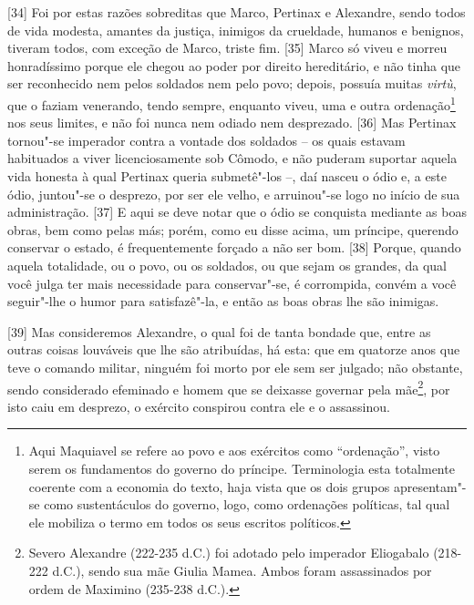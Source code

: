 {[}34{]} Foi por estas razões sobreditas que Marco, Pertinax e
Alexandre, sendo todos de vida modesta, amantes da justiça, inimigos da
crueldade, humanos e benignos, tiveram todos, com exceção de Marco,
triste fim. {[}35{]} Marco só viveu e morreu honradíssimo porque ele
chegou ao poder por direito hereditário, e não tinha que ser reconhecido
nem pelos soldados nem pelo povo; depois, possuía muitas \emph{virtù},
que o faziam venerando, tendo sempre, enquanto viveu, uma e outra
ordenação\footnote{Aqui Maquiavel se refere ao povo e aos exércitos como
  ``ordenação'', visto serem os fundamentos do governo do príncipe.
  Terminologia esta totalmente coerente com a economia do texto, haja
  vista que os dois grupos apresentam"-se como sustentáculos do governo,
  logo, como ordenações políticas, tal qual ele mobiliza o termo em
  todos os seus escritos políticos.} nos seus limites, e não foi nunca
nem odiado nem desprezado. {[}36{]} Mas Pertinax tornou"-se imperador
contra a vontade dos soldados -- os quais estavam habituados a viver
licenciosamente sob Cômodo, e não puderam suportar aquela vida honesta à
qual Pertinax queria submetê"-los --, daí nasceu o ódio e, a este ódio,
juntou"-se o desprezo, por ser ele velho, e arruinou"-se logo no início de
sua administração. {[}37{]} E aqui se deve notar que o ódio se conquista
mediante as boas obras, bem como pelas más; porém, como eu disse acima,
um príncipe, querendo conservar o estado, é frequentemente forçado a não
ser bom. {[}38{]} Porque, quando aquela totalidade, ou o povo, ou os
soldados, ou que sejam os grandes, da qual você julga ter mais
necessidade para conservar"-se, é corrompida, convém a você seguir"-lhe o
humor para satisfazê"-la, e então as boas obras lhe são inimigas.

{[}39{]} Mas consideremos Alexandre, o qual foi de tanta bondade que,
entre as outras coisas louváveis que lhe são atribuídas, há esta: que em
quatorze anos que teve o comando militar, ninguém foi morto por ele sem
ser julgado; não obstante, sendo considerado efeminado e homem que se
deixasse governar pela mãe\footnote{Severo Alexandre (222-235 d.C.) foi
  adotado pelo imperador Eliogabalo (218-222 d.C.), sendo sua mãe Giulia
  Mamea. Ambos foram assassinados por ordem de Maximino (235-238 d.C.).},
por isto caiu em desprezo, o exército conspirou contra ele e o
assassinou.

